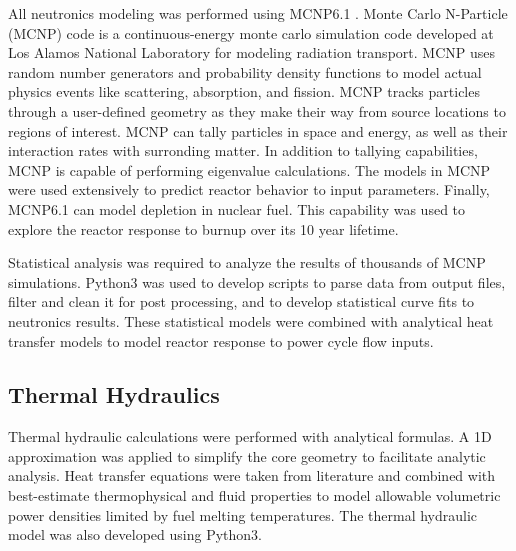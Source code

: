 All neutronics modeling was performed using MCNP6.1 \cite{mcnp_citation}. Monte
Carlo N-Particle (MCNP) code is a continuous-energy monte carlo simulation code
developed at Los Alamos National Laboratory
for modeling radiation transport. MCNP uses random number generators and
probability density functions to model actual physics events like scattering,
absorption, and fission. MCNP tracks particles through a user-defined geometry
as they make their way from source locations to regions of interest. MCNP can
tally particles in space and energy, as well as their interaction rates with
surronding matter. In addition to tallying capabilities, MCNP is capable of
performing eigenvalue calculations. The \keff models in MCNP were used
extensively to predict reactor behavior to input parameters. Finally, MCNP6.1
can model depletion in nuclear fuel. This capability was used to explore the
reactor response to burnup over its 10 year lifetime.

Statistical analysis was required to analyze the results of thousands of MCNP
simulations. Python3 was used to develop scripts to parse data from output
files, filter and clean it for post processing, and to develop statistical curve
fits to neutronics results. These statistical models were combined with
analytical heat transfer models to model reactor response to power cycle flow
inputs.

\subsection{Thermal Hydraulics}
Thermal hydraulic calculations were performed with analytical formulas. A 1D
approximation was applied to simplify the core geometry to facilitate analytic
analysis. Heat transfer equations were taken from literature and combined with
best-estimate thermophysical and fluid properties to model allowable volumetric
power densities limited by fuel melting temperatures. The thermal hydraulic
model was also developed using Python3.
